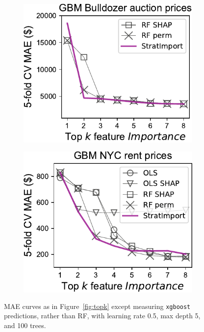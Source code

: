 \documentclass[11pt]{article}
\newcommand{\figref}[1]{Figure~\ref{#1}}
\begin{document}
\begin{figure}
\begin{subfigure}{.245\textwidth}
\subcaption{}
\end{subfigure}
\hfill
\begin{subfigure}{.245\textwidth}
    \centering
\includegraphics[scale=0.45]{images/bulldozer-topk-GBM-Importance.pdf}
\subcaption{}
\end{subfigure}%
\hfill
\begin{subfigure}{.245\textwidth}
    \centering
\includegraphics[scale=0.45]{images/rent-topk-GBM-Importance.pdf}
\subcaption{}
\end{subfigure}
\caption[short]{\small MAE curves as in \figref{fig:topk} except measuring {\tt xgboost} predictions, rather than RF, with learning rate 0.5,  max depth 5, and 100 trees.}
\label{fig:topk-gbm}
\end{figure}
\end{document}
